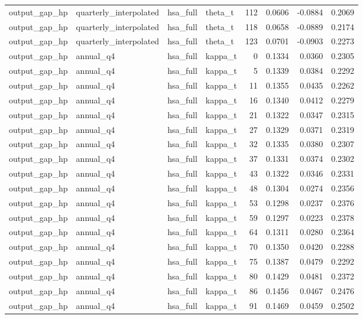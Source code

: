 \begin{tabular}{llllrrrr}
output\_gap\_hp & quarterly\_interpolated & hsa\_full & theta\_t & 112 & 0.0606 & -0.0884 & 0.2069 \\
output\_gap\_hp & quarterly\_interpolated & hsa\_full & theta\_t & 118 & 0.0658 & -0.0889 & 0.2174 \\
output\_gap\_hp & quarterly\_interpolated & hsa\_full & theta\_t & 123 & 0.0701 & -0.0903 & 0.2273 \\
output\_gap\_hp & annual\_q4 & hsa\_full & kappa\_t & 0 & 0.1334 & 0.0360 & 0.2305 \\
output\_gap\_hp & annual\_q4 & hsa\_full & kappa\_t & 5 & 0.1339 & 0.0384 & 0.2292 \\
output\_gap\_hp & annual\_q4 & hsa\_full & kappa\_t & 11 & 0.1355 & 0.0435 & 0.2262 \\
output\_gap\_hp & annual\_q4 & hsa\_full & kappa\_t & 16 & 0.1340 & 0.0412 & 0.2279 \\
output\_gap\_hp & annual\_q4 & hsa\_full & kappa\_t & 21 & 0.1322 & 0.0347 & 0.2315 \\
output\_gap\_hp & annual\_q4 & hsa\_full & kappa\_t & 27 & 0.1329 & 0.0371 & 0.2319 \\
output\_gap\_hp & annual\_q4 & hsa\_full & kappa\_t & 32 & 0.1335 & 0.0380 & 0.2307 \\
output\_gap\_hp & annual\_q4 & hsa\_full & kappa\_t & 37 & 0.1331 & 0.0374 & 0.2302 \\
output\_gap\_hp & annual\_q4 & hsa\_full & kappa\_t & 43 & 0.1322 & 0.0346 & 0.2331 \\
output\_gap\_hp & annual\_q4 & hsa\_full & kappa\_t & 48 & 0.1304 & 0.0274 & 0.2356 \\
output\_gap\_hp & annual\_q4 & hsa\_full & kappa\_t & 53 & 0.1298 & 0.0237 & 0.2376 \\
output\_gap\_hp & annual\_q4 & hsa\_full & kappa\_t & 59 & 0.1297 & 0.0223 & 0.2378 \\
output\_gap\_hp & annual\_q4 & hsa\_full & kappa\_t & 64 & 0.1311 & 0.0280 & 0.2364 \\
output\_gap\_hp & annual\_q4 & hsa\_full & kappa\_t & 70 & 0.1350 & 0.0420 & 0.2288 \\
output\_gap\_hp & annual\_q4 & hsa\_full & kappa\_t & 75 & 0.1387 & 0.0479 & 0.2292 \\
output\_gap\_hp & annual\_q4 & hsa\_full & kappa\_t & 80 & 0.1429 & 0.0481 & 0.2372 \\
output\_gap\_hp & annual\_q4 & hsa\_full & kappa\_t & 86 & 0.1456 & 0.0467 & 0.2476 \\
output\_gap\_hp & annual\_q4 & hsa\_full & kappa\_t & 91 & 0.1469 & 0.0459 & 0.2502 \\

\end{tabular}
